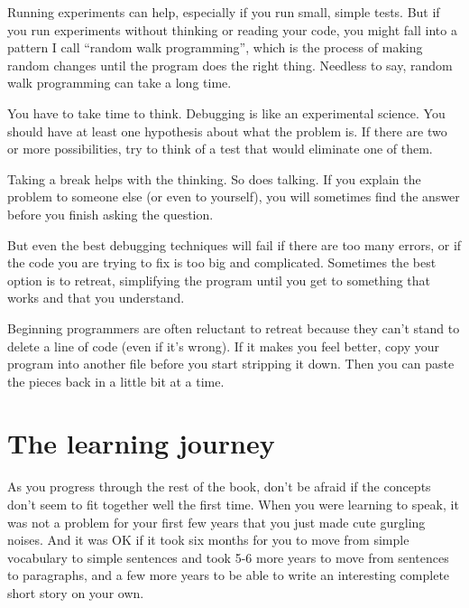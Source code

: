 
Running experiments can help, especially if you run small, simple tests. But if you run experiments without thinking or reading your code, you might fall into a pattern I call ``random walk programming'', which is the process of making random changes until the program does the right thing. Needless to say, random walk programming can take a long time.


You have to take time to think. Debugging is like an experimental science. You should have at least one hypothesis about what the problem is. If there are two or more possibilities, try to think of a test that would eliminate one of them.

Taking a break helps with the thinking. So does talking. If you explain the problem to someone else (or even to yourself), you will sometimes find the answer before you finish asking the question.

But even the best debugging techniques will fail if there are too many errors, or if the code you are trying to fix is too big and complicated. Sometimes the best option is to retreat, simplifying the program until you get to something that works and that you understand.

Beginning programmers are often reluctant to retreat because they can't stand to delete a line of code (even if it's wrong). If it makes you feel better, copy your program into another file before you start stripping it down. Then you can paste the pieces back in a little bit at a time.

\hypertarget{el-camino-del-aprendizaje}{%
\section{The learning journey}\label{el-camino-del-aprendizaje}}

As you progress through the rest of the book, don't be afraid if the concepts don't seem to fit together well the first time. When you were learning to speak, it was not a problem for your first few years that you just made cute gurgling noises. And it was OK if it took six months for you to move from simple vocabulary to simple sentences and took 5-6 more years to move from sentences to paragraphs, and a few more years to be able to write an interesting complete short story on your own.

